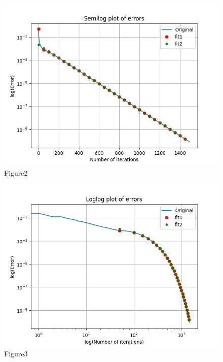 \documentclass[11pt, a4paper]{article}
\begin{document}
\begin{figure}[!tbh]
\centering
\includegraphics[scale=0.45]{Assgn5_plot2.png} 
\caption{Figure2}
\label{fig2}
\end{figure}

\begin{figure}[!tbh]
\centering
\includegraphics[scale=0.45]{Assgn5_plot3.png} 
\caption{Figure3}
\label{fig3}
\end{figure}
\end{document}
